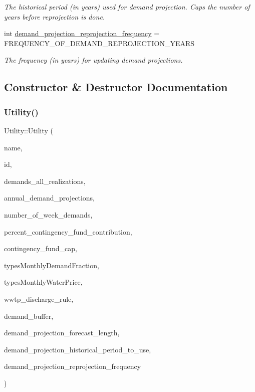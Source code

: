 \begin{DoxyCompactItemize}
\begin{DoxyCompactList}\small\item\em The historical period (in years) used for demand projection. Caps the number of years before reprojection is done. \end{DoxyCompactList}\item 
int \mbox{\hyperlink{classUtility_a1cfe05e6efb78a67e32e5849ee0918d5}{demand\+\_\+projection\+\_\+reprojection\+\_\+frequency}} = F\+R\+E\+Q\+U\+E\+N\+C\+Y\+\_\+\+O\+F\+\_\+\+D\+E\+M\+A\+N\+D\+\_\+\+R\+E\+P\+R\+O\+J\+E\+C\+T\+I\+O\+N\+\_\+\+Y\+E\+A\+RS
\begin{DoxyCompactList}\small\item\em The frequency (in years) for updating demand projections. \end{DoxyCompactList}\end{DoxyCompactItemize}


\subsection{Constructor \& Destructor Documentation}
\mbox{\label{classUtility_a53fb19e5a344de5892c5cfbcc1225da9}} 
\subsubsection{\texorpdfstring{Utility()}{Utility()}\hspace{0.1cm}{\footnotesize\ttfamily [1/4]}}
{\footnotesize\ttfamily Utility\+::\+Utility (\begin{DoxyParamCaption}\item[{const char $\ast$}]{name,  }\item[{int}]{id,  }\item[{vector$<$ vector$<$ double $>$$>$ \&}]{demands\+\_\+all\+\_\+realizations,  }\item[{vector$<$ double $>$ \&}]{annual\+\_\+demand\+\_\+projections,  }\item[{int}]{number\+\_\+of\+\_\+week\+\_\+demands,  }\item[{const double}]{percent\+\_\+contingency\+\_\+fund\+\_\+contribution,  }\item[{const double}]{contingency\+\_\+fund\+\_\+cap,  }\item[{const vector$<$ vector$<$ double $>$$>$ \&}]{types\+Monthly\+Demand\+Fraction,  }\item[{const vector$<$ vector$<$ double $>$$>$ \&}]{types\+Monthly\+Water\+Price,  }\item[{Wwtp\+Discharge\+Rule}]{wwtp\+\_\+discharge\+\_\+rule,  }\item[{double}]{demand\+\_\+buffer,  }\item[{int}]{demand\+\_\+projection\+\_\+forecast\+\_\+length,  }\item[{int}]{demand\+\_\+projection\+\_\+historical\+\_\+period\+\_\+to\+\_\+use,  }\item[{int}]{demand\+\_\+projection\+\_\+reprojection\+\_\+frequency }\end{DoxyParamCaption})}



